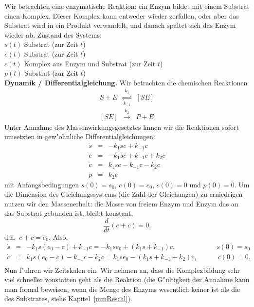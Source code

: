 Wir betrachten eine enzymatische Reaktion: ein Enzym bildet mit einem
Substrat einen Komplex. Dieser Komplex kann entweder wieder zerfallen, oder aber
das Substrat wird in ein Produkt verwandelt, und danach spaltet sich das Enzym wieder ab.
Zustand des Systems:\\
$s(t)$ Substrat (zur Zeit $t$)\\
$e(t)$ Substrat (zur Zeit $t$)\\
$c(t)$ Komplex aus Enzym und Substrat (zur Zeit $t$)\\
$p(t)$ Substrat (zur Zeit $t$)\\
{\bf Dynamik / Differentialgleichung.} Wir betrachten die chemischen Reaktionen
\begin{eqnarray*}
S + E    & \mathop{\rightleftharpoons}\limits_{k_{-1}}^{k_1} & [SE]\\
 {[SE]}  &  \mathop{\rightarrow}\limits^{k_2} & P+E
\end{eqnarray*}
Unter Annahme des Massenwirkungsgesetztes knnen wir die Reaktionen sofort umsetzten in 
 gew"ohnliche Differentialgleichungen:
\begin{eqnarray*}
\dot s & = & -k_1 s e + k_{-1} c\\
\dot e & = & -k_1 s e + k_{-1} c + k_2 c\\
\dot c & = & k_1 s e - k_{-1} c - k_2 c\\
\dot p & = & k_2 c
\end{eqnarray*}
mit Anfangsbedingungen $s(0) = s_0$, $e(0) = e_0$, $c(0) = 0$ und $p(0) = 0$.
Um die Dimension des Gleichungssystems (die Zahl der Gleichungen) zu erniedrigen
nutzen wir den Massenerhalt: die Masse von freiem Enzym und Enzym das  an das
Substrat gebunden ist, bleibt konstant,
$$ \frac d {dt} (e+c) = 0.$$
d.h.\ $ e+ c = e_0$. Also,
\begin{eqnarray*}
\dot s & = & -k_1 s (e_0-c) + k_{-1} c
        =  -k_1 s e_0 + (k_1 s + k_{-1}) c,\qquad\qquad\qquad s(0) = s_0\\
\dot c & = & k_1 s (e_0-c) - k_{-1} c - k_2 c
        =  k_1 s e_0 - (k_1 s + k_{-1} + k_2) c,\quad\qquad c(0) = 0.\\
\end{eqnarray*}
Nun f"uhren wir Zeitskalen ein. Wir nehmen an, dass die Komplexbildung sehr viel schneller
vonstatten geht als die Reaktion (die G"ultigkeit der Annahme kann man formal beweisen, wenn
die Menge des Enzyms wesentlich keiner ist als die des Substrates, siehe Kapitel~\ref{mmRescal}).
